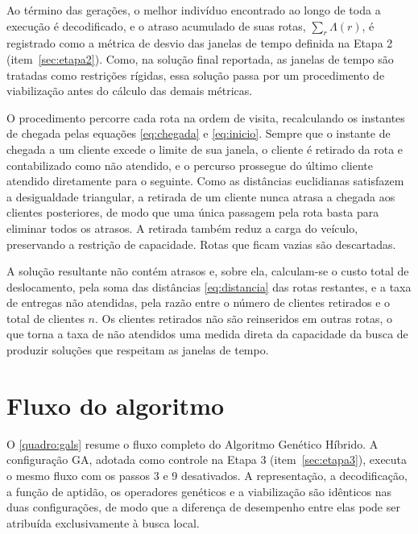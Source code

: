 Ao término das gerações, o melhor indivíduo encontrado ao longo de toda a execução é
decodificado, e o atraso acumulado de suas rotas, $\sum_{r} \Lambda(r)$, é registrado
como a métrica de desvio das janelas de tempo definida na Etapa 2
(item~\ref{sec:etapa2}). Como, na solução final reportada, as janelas de tempo são
tratadas como restrições rígidas, essa solução passa por um procedimento de
viabilização antes do cálculo das demais métricas.

O procedimento percorre cada rota na ordem de visita, recalculando os instantes de
chegada pelas equações \eqref{eq:chegada} e \eqref{eq:inicio}. Sempre que o instante de
chegada a um cliente excede o limite de sua janela, o cliente é retirado da rota e
contabilizado como não atendido, e o percurso prossegue do último cliente atendido
diretamente para o seguinte. Como as distâncias euclidianas satisfazem a desigualdade
triangular, a retirada de um cliente nunca atrasa a chegada aos clientes posteriores,
de modo que uma única passagem pela rota basta para eliminar todos os atrasos. A
retirada também reduz a carga do veículo, preservando a restrição de capacidade. Rotas
que ficam vazias são descartadas.

A solução resultante não contém atrasos e, sobre ela, calculam-se o custo total de
deslocamento, pela soma das distâncias \eqref{eq:distancia} das rotas restantes, e a
taxa de entregas não atendidas, pela razão entre o número de clientes retirados e o
total de clientes $n$. Os clientes retirados não são reinseridos em outras rotas, o que
torna a taxa de não atendidos uma medida direta da capacidade da busca de produzir
soluções que respeitam as janelas de tempo.

\section{Fluxo do algoritmo}
\label{sec:fluxo}

O \autoref{quadro:gals} resume o fluxo completo do Algoritmo Genético Híbrido. A
configuração GA, adotada como controle na Etapa 3 (item~\ref{sec:etapa3}), executa o
mesmo fluxo com os passos 3 e 9 desativados. A representação, a decodificação, a
função de aptidão, os operadores genéticos e a viabilização são idênticos nas duas
configurações, de modo que a diferença de desempenho entre elas pode ser atribuída
exclusivamente à busca local.

